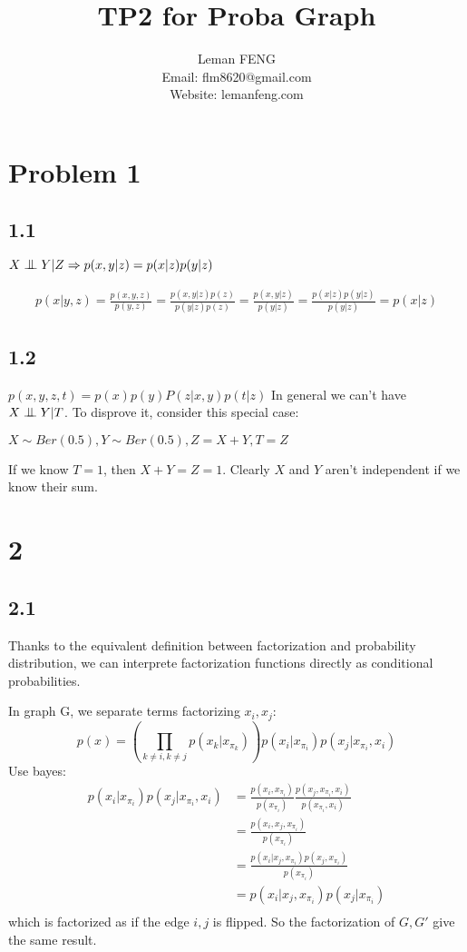 \documentclass{article}
\title{TP2 for Proba Graph}
\author{Leman FENG\\ Email: flm8620@gmail.com\\Website: lemanfeng.com}
\newcommand{\bigCI}{\mathrel{\text{\scalebox{1.07}{$\perp\mkern-10mu\perp$}}}}
\begin{document}
	\maketitle
	\section{Problem 1}
	\subsection{1.1}
	$X \bigCI Y | Z \Rightarrow p(x,y|z) = p(x|z) p(y|z)$ 
	
	\begin{equation*}
	\begin{split}
	p(x|y,z)=\frac{p(x,y,z)}{p(y,z)} = \frac{p(x,y|z)p(z)}{p(y|z)p(z)} = \frac{p(x,y|z)}{p(y|z)} = \frac{p(x|z)p(y|z)}{p(y|z)} = p(x|z)
	\end{split}
	\end{equation*}
	
	\subsection{1.2}
	$p(x,y,z,t) = p(x)p(y)P(z|x,y)p(t|z)$
	In general we can't have $X \bigCI Y | T$. To disprove it, consider this special case:
	
	$X \sim Ber(0.5), Y \sim Ber(0.5), Z=X+Y, T=Z$
	
	If we know $T=1$, then $X+Y=Z=1$. Clearly $X$ and $Y$ aren't independent if we know their sum.
	
	\section{2}
	\subsection{2.1}
	Thanks to the equivalent definition between factorization and probability distribution, we can interprete factorization functions directly as conditional probabilities.
	
	In graph G, we separate terms factorizing $x_i, x_j$:
	\begin{equation}
	p(x) = \left ( \prod_{k\neq i, k\neq j} p(x_k | x_{\pi_k}) \right ) p(x_i|x_{\pi_i}) p(x_j|x_{\pi_i}, x_i)
	\end{equation}
	Use bayes:
	\begin{equation}
	\begin{split}
	p(x_i|x_{\pi_i}) p(x_j|x_{\pi_i}, x_i) &= \frac{p(x_i,x_{\pi_i})}{p(x_{\pi_i})} \frac{p(x_j, x_{\pi_i}, x_i)}{p( x_{\pi_i}, x_i)}\\
	&=\frac{p(x_i , x_j, x_{\pi_i})}{p(x_{\pi_i})}\\
	&=\frac{p(x_i | x_j, x_{\pi_i}) p(x_j, x_{\pi_i}) }{p(x_{\pi_i})}\\
	&=p(x_i | x_j, x_{\pi_i}) p(x_j | x_{\pi_i}) \\
	\end{split}
	\end{equation}
	which is factorized as if the edge $i,j$ is flipped. So the factorization of $G, G'$ give the same result.
	
\end{document}
